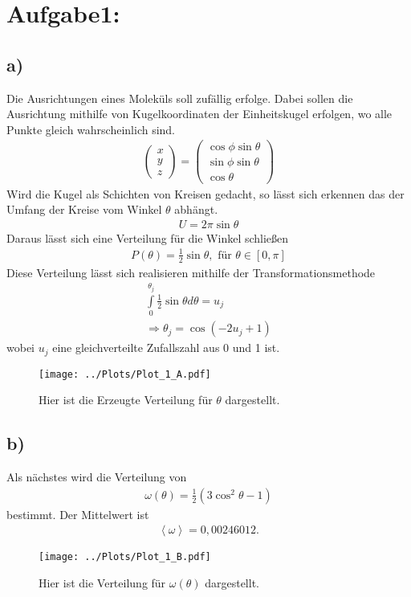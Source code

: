 
\section*{Aufgabe1: }
\subsection*{a)}
Die Ausrichtungen eines Moleküls soll zufällig erfolge.
Dabei sollen die Ausrichtung mithilfe von Kugelkoordinaten der Einheitskugel erfolgen, wo alle Punkte gleich wahrscheinlich sind.
\begin{align}
	\begin{pmatrix}
		x\\ y\\ z
	\end{pmatrix}
	=
	\begin{pmatrix}
	\cos\phi\sin\theta\\
	\sin\phi\sin\theta\\
	\cos\theta
	\end{pmatrix}
\end{align}
Wird die Kugel als Schichten von Kreisen gedacht, so lässt sich erkennen das der Umfang der Kreise vom Winkel $\theta $ abhängt.
\begin{align}
	U=2\pi \sin\theta
\end{align}
Daraus lässt sich eine Verteilung für die Winkel schließen
\begin{align}
	P(\theta)=\frac{1}{2}\sin\theta, \text{ für } \theta\in[0,\pi]
\end{align}
Diese Verteilung lässt sich realisieren mithilfe der Transformationsmethode
\begin{align}
	\int\limits_{0}^{\theta_j}\frac{1}{2}\sin\theta d\theta = u_j\\
	\Rightarrow \theta_j =  \cos(-2u_j +1)
\end{align}
wobei $u_j$ eine gleichverteilte Zufallszahl aus 0 und 1 ist.
\begin{figure}
	\centering
	\texttt{[image: ../Plots/Plot\_1\_A.pdf]}
	\caption{Hier ist die Erzeugte Verteilung für $\theta$ dargestellt.}
\end{figure}
\newpage
\subsection*{b)}
Als nächstes wird die Verteilung von
\begin{align}
	\omega(\theta) = \frac{1}{2}(3\cos^2\theta-1)
\end{align}
bestimmt.
Der Mittelwert ist 
\begin{align}
	\left< \omega \right> = 0,00246012.
\end{align}
\begin{figure}[h!]
	\centering
	\texttt{[image: ../Plots/Plot\_1\_B.pdf]}
	\caption{Hier ist die Verteilung für $\omega(\theta)$ dargestellt.}
\end{figure}
